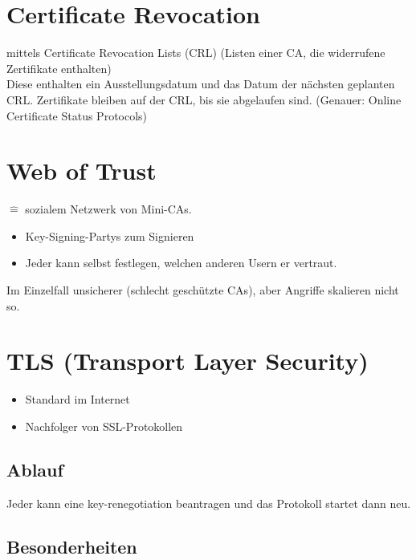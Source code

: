 \documentclass[a4paper,twoside,DIV15,BCOR12mm]{scrbook}
\begin{document}
\section{Certificate Revocation}

mittels Certificate Revocation Lists (CRL) (Listen einer CA, die widerrufene Zertifikate enthalten)\\

Diese enthalten ein Ausstellungsdatum und das Datum der nächsten geplanten CRL. Zertifikate bleiben auf der CRL, bis sie abgelaufen sind. (Genauer: Online Certificate Status Protocols)

\section{Web of Trust}

$\mathrel{\widehat{=}}$ sozialem Netzwerk von \glqq Mini-CAs\grqq.

\begin{itemize}
	\item Key-Signing-Partys zum Signieren
	\item Jeder kann selbst festlegen, welchen anderen Usern er vertraut.
\end{itemize}

Im Einzelfall unsicherer (schlecht geschützte CAs), aber Angriffe skalieren nicht so.

\section{TLS (Transport Layer Security)}

\begin{itemize}
	\item Standard im Internet
	\item Nachfolger von SSL-Protokollen
\end{itemize}

\subsection{Ablauf}


Jeder kann eine key-renegotiation beantragen und das Protokoll startet dann neu.

\subsection{Besonderheiten}
\end{document}
